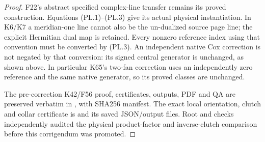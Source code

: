\begin{proof}
F22's abstract specified complex-line transfer remains its proved
construction. Equations (PL.1)--(PL.3) give its actual physical
instantiation. In K6/K7 a meridian-one line cannot also be the
un-dualized source page line; the explicit Hermitian dual map is
retained. Every nonzero reference index using that convention must
be converted by (PL.3). An independent native Cox correction is
not negated by that conversion: its signed central generator is
unchanged, as shown above. In particular K65's two-fan correction
uses an independently zero reference and the same native generator,
so its proved classes are unchanged.

The pre-correction K42/F56 proof, certificates, outputs, PDF and QA
are preserved verbatim in , with
SHA256 manifest. The exact local orientation, clutch and collar
certificate is  and its
saved JSON/output files. Root and checks independently audited the
physical product-factor and inverse-clutch comparison before this
corrigendum was promoted.
\end{proof}
